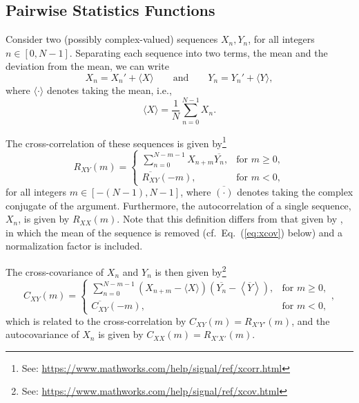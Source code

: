 \documentclass[11pt, oneside]{article}
\newcommand{\eqnref}[1]{Eq.~(\ref{#1})}
\begin{document}
\subsection{Pairwise Statistics Functions}
Consider two (possibly complex-valued) sequences $X_n,Y_n$, for all integers $n \in [0,N-1]$.
Separating each sequence into two terms, the mean and the deviation from the mean, we can write
\begin{equation} %
X_n = X_n' + \langle X \rangle
\quad\quad \text{and} \quad\quad
Y_n = Y_n' + \langle Y \rangle,
\end{equation}
where $\langle \cdot \rangle$ denotes taking the mean, i.e.,
\begin{equation}
\langle X \rangle = \frac{1}{N} \sum_{n = 0}^{N-1} X_n.
\end{equation}

The cross-correlation of these sequences is given by\footnote{See: \url{https://www.mathworks.com/help/signal/ref/xcorr.html}}
\begin{equation}\label{eq:xcorr}
R_{XY}(m) =
\begin{cases}
\displaystyle \sum_{n=0}^{N-m-1} X_{n+m} \overline{Y_n}, & \text{for } m \geq 0,\\[20pt]
\overline{R_{XY}}(-m), & \text{for } m < 0,
\end{cases}
\end{equation}
for all integers $m \in [-(N-1),N-1]$, where $\overline{(\cdot)}$ denotes taking the complex conjugate of the argument.
Furthermore, the autocorrelation of a single sequence, $X_n$, is given by $R_{XX}(m)$.
Note that this definition differs from that given by \citet[Sec.~8.2.1]{Stull1988}, in which the mean of the sequence is removed (cf.~\eqnref{eq:xcov} below) and a normalization factor is included.

The cross-covariance of $X_n$ and $Y_n$ is then given by\footnote{See: \url{https://www.mathworks.com/help/signal/ref/xcov.html}}
\begin{equation}\label{eq:xcov}
C_{XY}(m) = 
\begin{cases}
\displaystyle \sum_{n=0}^{N-m-1} \left( X_{n+m} - \langle X \rangle \right) \left( \overline{Y_n} - \left\langle \overline{Y} \right\rangle \right), & \text{for } m \geq 0,\\[20pt]
\overline{C_{XY}}(-m), & \text{for } m < 0,
\end{cases},
\end{equation}
which is related to the cross-correlation by $C_{XY}(m) = R_{X'Y'}(m)$, and the autocovariance of $X_n$ is given by $C_{XX}(m) = R_{X'X'}(m)$.
\end{document}
